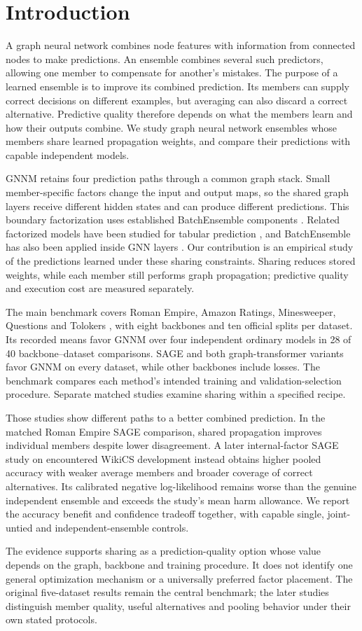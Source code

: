 \section{Introduction}
A graph neural network combines node features with information from connected nodes to make predictions. An ensemble combines several such predictors, allowing one member to compensate for another's mistakes. The purpose of a learned ensemble is to improve its combined prediction. Its members can supply correct decisions on different examples, but averaging can also discard a correct alternative. Predictive quality therefore depends on what the members learn and how their outputs combine. We study graph neural network ensembles whose members share learned propagation weights, and compare their predictions with capable independent models.

GNNM retains four prediction paths through a common graph stack. Small member-specific factors change the input and output maps, so the shared graph layers receive different hidden states and can produce different predictions. This boundary factorization uses established BatchEnsemble components \citep{wen2020batchensemble}. Related factorized models have been studied for tabular prediction \citep{gorishniy2025tabm}, and BatchEnsemble has also been applied inside GNN layers \citep{kim2023efficient}. Our contribution is an empirical study of the predictions learned under these sharing constraints. Sharing reduces stored weights, while each member still performs graph propagation; predictive quality and execution cost are measured separately.

The main benchmark covers Roman Empire, Amazon Ratings, Minesweeper, Questions and Tolokers \citep{platonov2023critical}, with eight backbones and ten official splits per dataset. Its recorded means favor GNNM over four independent ordinary models in 28 of 40 backbone--dataset comparisons. SAGE and both graph-transformer variants favor GNNM on every dataset, while other backbones include losses. The benchmark compares each method's intended training and validation-selection procedure. Separate matched studies examine sharing within a specified recipe.

Those studies show different paths to a better combined prediction. In the matched Roman Empire SAGE comparison, shared propagation improves individual members despite lower disagreement. A later internal-factor SAGE study on encountered WikiCS development instead obtains higher pooled accuracy with weaker average members and broader coverage of correct alternatives. Its calibrated negative log-likelihood remains worse than the genuine independent ensemble and exceeds the study's mean harm allowance. We report the accuracy benefit and confidence tradeoff together, with capable single, joint-untied and independent-ensemble controls.

The evidence supports sharing as a prediction-quality option whose value depends on the graph, backbone and training procedure. It does not identify one general optimization mechanism or a universally preferred factor placement. The original five-dataset results remain the central benchmark; the later studies distinguish member quality, useful alternatives and pooling behavior under their own stated protocols.

